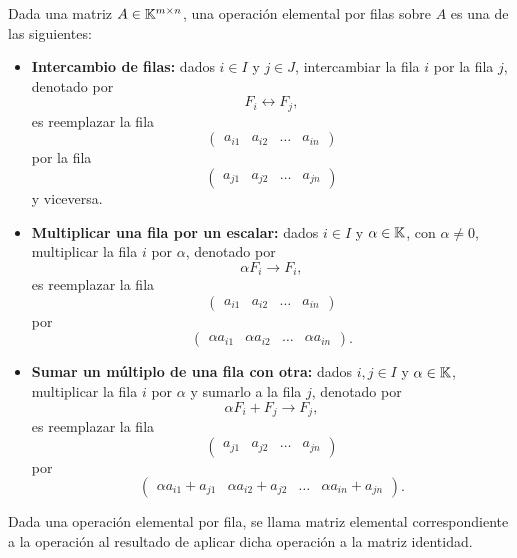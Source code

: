\documentclass[a4,11pt]{aleph-notas}
\begin{document}
\begin{defi}
    Dada una matriz $A\in\mathbb{K}^{m \times n}$, una operación elemental por filas sobre $A$ es una de las siguientes:
    \begin{itemize}
    \item   
        \textbf{Intercambio de filas:} dados $i\in I$ y $j\in J$, intercambiar la fila $i$ por la fila $j$, denotado por
        \[
            F_i \leftrightarrow F_j,
        \]
        es reemplazar la fila
        \[
            \begin{pmatrix}a_{i1}&a_{i2}&\ldots& a_{in}\end{pmatrix}
        \]
        por la fila
        \[
            \begin{pmatrix}a_{j1}&a_{j2}&\ldots& a_{jn}\end{pmatrix}
        \]
        y viceversa.
    \item 
        \textbf{Multiplicar una fila por un escalar:} dados $i\in I$ y $\alpha\in \mathbb{K}$, con $\alpha\neq 0$, multiplicar la fila $i$ por $\alpha$, denotado por
        \[
            \alpha F_i \rightarrow F_i,
        \]
        es reemplazar la fila
        \[
            \begin{pmatrix}a_{i1}&a_{i2}&\ldots& a_{in}\end{pmatrix}
        \]
        por 
        \[
            \begin{pmatrix}\alpha a_{i1}&\alpha a_{i2}&\ldots&\alpha a_{in}\end{pmatrix}.
        \]
    \item 
        \textbf{Sumar un múltiplo de una fila con otra:} dados $i,j\in I$ y $\alpha\in \mathbb{K}$, multiplicar la fila $i$ por $\alpha$ y sumarlo a la fila $j$, denotado por
        \[
            \alpha F_i + F_j\rightarrow F_j,
        \]
        es reemplazar la fila
        \[
            \begin{pmatrix}a_{j1}&a_{j2}&\ldots& a_{jn}\end{pmatrix}
        \]
        por 
        \[
            \begin{pmatrix}\alpha a_{i1} + a_{j1}&\alpha a_{i2} + a_{j2}&\ldots&\alpha a_{in} + a_{jn}\end{pmatrix}.
        \]
\end{itemize}
\end{defi}

\begin{defi}
    Dada una operación elemental por fila, se llama matriz elemental correspondiente a la operación al resultado de aplicar dicha operación a la matriz identidad.
\end{defi}
\end{document}
